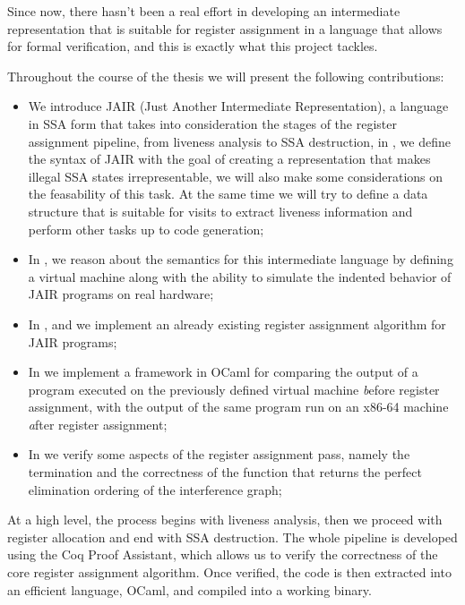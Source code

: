 Since now, there hasn't been a real effort in developing an intermediate representation that is suitable for register assignment in a language that allows for formal verification, and this is exactly what this project tackles.

Throughout the course of the thesis we will present the following contributions:
\begin{itemize}
    \item We introduce JAIR (Just Another Intermediate Representation), a language in SSA form that takes into consideration the stages of the register assignment pipeline, from liveness analysis to SSA destruction, in , we define the syntax of JAIR with the goal of creating a representation that makes illegal SSA states irrepresentable, we will also make some considerations on the feasability of this task. At the same time we will try to define a data structure that is suitable for visits to extract liveness information and perform other tasks up to code generation;

    \item In , we reason about the semantics for this intermediate language by defining a virtual machine along with the ability to simulate the indented behavior of JAIR programs on real hardware;

    \item In ,  and  we implement an already existing register assignment algorithm for JAIR programs;

    \item In  we implement a framework in OCaml for comparing the output of a program executed on the previously defined virtual machine \textit before register assignment, with the output of the same program run on an x86-64 machine \textit after register assignment;

    \item In  we verify some aspects of the register assignment pass, namely the termination and the {\color{red} correctness} of the function that returns the perfect elimination ordering of the interference graph;
\end{itemize}

At a high level, the process begins with liveness analysis, then we proceed with register allocation and end with SSA destruction. The whole pipeline is developed using the Coq Proof Assistant, which allows us to verify the correctness of the core register assignment algorithm. Once verified, the code is then extracted into an efficient language, OCaml, and compiled into a working binary.